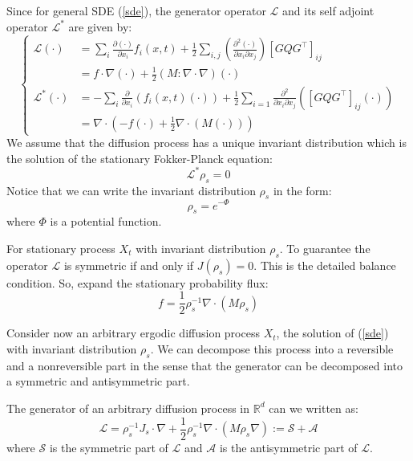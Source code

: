 Since for general SDE (\ref{sde}), the generator operator $\mathcal{L}$ and its self adjoint operator $\mathcal{L}^*$ are given by:
\begin{equation}\left\{
\begin{aligned}
    \mathcal{L}(\cdot)&=\sum_{i} \frac{\partial(\cdot)}{\partial x_{i}} f_{i}(x, t)+\frac{1}{2} \sum_{i, j}\left(\frac{\partial^{2}(\cdot)}{\partial x_{i} \partial x_{j}}\right)\left[GQ G^{\top}\right]_{i j}\\
    &= f\cdot \nabla(\cdot) + \frac{1}{2} \left(M:\nabla\cdot \nabla\right)(\cdot)\\
    \mathcal{L}^*(\cdot)&=-\sum_{i} \frac{\partial}{\partial x_{i}}\left(f_{i}(x, t) (\cdot)\right)+\frac{1}{2} \sum_{i=1} \frac{\partial^{2}}{\partial x_{i} \partial x_{j}}\left(\left[G Q G^{\top}\right]_{i j}(\cdot)\right)\\
    & = \nabla\cdot (-f(\cdot)+\frac{1}{2}\nabla\cdot(M(\cdot)))
\end{aligned}\right.
\end{equation}
We assume that the diffusion process has a unique invariant distribution which is the solution of the stationary Fokker-Planck equation:
\begin{equation}
    \mathcal{L}^*\rho_s=0
\end{equation}
Notice that we can write the invariant distribution $\rho_s$ in the form:
\begin{equation}
    \rho_s = e^{-\Phi}
\end{equation}
where $\Phi$ is a potential function.
\begin{theorem}
    For stationary process $X_t$ with invariant distribution $\rho_s$.
    To guarantee the operator $\mathcal{L}$ is symmetric if and only if $J(\rho_s)=0$. This is the detailed balance condition.
    So, expand the stationary probability flux:
    \begin{equation}
        f = \frac{1}{2}\rho_s^{-1}\nabla\cdot\left(M\rho_s\right)
    \end{equation}
\end{theorem}

Consider now an arbitrary ergodic diffusion process $X_t$, the solution of (\ref{sde}) with invariant distribution $\rho_s$.
We can decompose this process into a reversible and a nonreversible part in the sense that the generator  can be decomposed into a symmetric and antisymmetric part.

\begin{theorem}
    The generator of an arbitrary diffusion process in $\mathbb{R}^d$ can we written as:
    \begin{equation}
        \mathcal{L} = \rho_s^{-1}J_s\cdot \nabla + \frac{1}{2}\rho_s^{-1}\nabla\cdot\left(M\rho_s\nabla\right):=\mathcal{S}+\mathcal{A}
    \end{equation}
    where $\mathcal{S}$ is the symmetric part of $\mathcal{L}$ and $\mathcal{A}$ is the antisymmetric part of $\mathcal{L}$.
\end{theorem}

